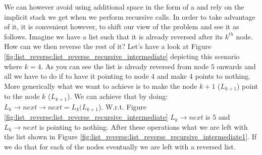 We can however avoid using additional space in the form of a  and rely on the
implicit stack we get when we perform recursive calls. In order to take advantage of it, it is
convenient however, to shift our view of the problem and see it as follows. Imagine we have a list
such that it is already reversed after its $k^{th}$ node. How can we then reverse the rest of it?
Let's have a look at Figure \ref{fig:list_reverse:list_reverse_recursive_intermediate} depicting
this scenario where $k=4$. As you can see the list is already reversed from node $5$ onwards and all
we have to do if to have it pointing to node $4$ and make $4$ points to nothing. More generically
what we want to achieve is to make the node $k+1$ ($L_{k+1}$) point to the node $k$ ($L_{k+1}$). We
can achieve that by doing: $L_{k} \rightarrow next \rightarrow next= L_{k}(L_{k+1}$). W.r.t. Figure
\ref{fig:list_reverse:list_reverse_recursive_intermediate} $L_{k} \rightarrow next$ is $5$ and
$L_{k} \rightarrow next$ is pointing to nothing. After these operations what we are left with the
list  shown in Figure \ref{fig:list_reverse:list_reverse_recursive_intermediate1}. If we do that for
each of the nodes eventually we are left with a reversed list. 

